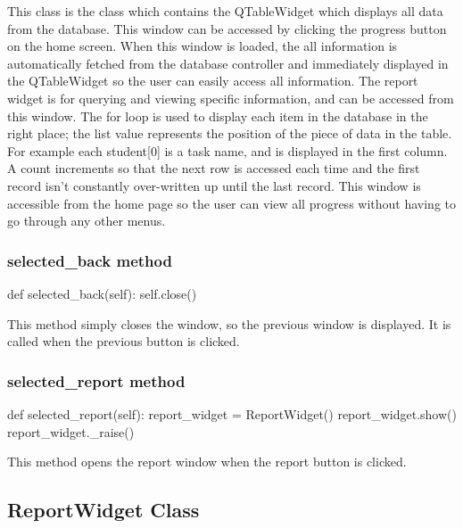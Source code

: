 This class is the class which contains the QTableWidget which displays all data from the database. This window can be accessed by clicking the progress button on the home screen. When this window is loaded, the all information is automatically fetched from the database controller and immediately displayed in the QTableWidget so the user can easily access all information. The report widget is for querying and viewing specific information, and can be accessed from this window. The for loop is used to display each item in the database in the right place; the list value represents the position of the piece of data in the table. For example each student[0] is a task name, and is displayed in the first column. A count increments so that the next row is accessed each time and the first record isn't constantly over-written up until the last record. This window is accessible from the home page so the user can view all progress without having to go through any other menus.

\subsubsection{selected\_back method}

\begin{python}
def selected_back(self):
        self.close()
\end{python}

This method simply closes the window, so the previous window is displayed. It is called when the previous button is clicked.

\subsubsection{selected\_report method}

\begin{python}
def selected_report(self):
        report_widget = ReportWidget()
        report_widget.show()
        report_widget._raise()
\end{python}

This method opens the report window when the report button is clicked.

\subsection{ReportWidget Class}


